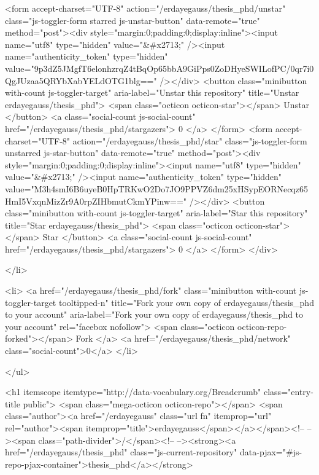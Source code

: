     <form accept-charset="UTF-8" action="/erdayegauss/thesis_phd/unstar" class="js-toggler-form starred js-unstar-button" data-remote="true" method="post"><div style="margin:0;padding:0;display:inline"><input name="utf8" type="hidden" value="&#x2713;" /><input name="authenticity_token" type="hidden" value="9p3dZ5JMgfT6elonhzrqZ4tBqOp65bbA9GiPps0ZoDHyeSWILofPC/0qr7i0QgJUzaa5QRYbXabYELdOTG1blg==" /></div>
      <button
        class="minibutton with-count js-toggler-target"
        aria-label="Unstar this repository" title="Unstar erdayegauss/thesis_phd">
        <span class="octicon octicon-star"></span>
        Unstar
      </button>
        <a class="social-count js-social-count" href="/erdayegauss/thesis_phd/stargazers">
          0
        </a>
</form>
    <form accept-charset="UTF-8" action="/erdayegauss/thesis_phd/star" class="js-toggler-form unstarred js-star-button" data-remote="true" method="post"><div style="margin:0;padding:0;display:inline"><input name="utf8" type="hidden" value="&#x2713;" /><input name="authenticity_token" type="hidden" value="M3h4smI6B6uyeB0HpTRKwO2Do7JO9PPVZ6dm25xHSypEORNecqz65HmI5VxqnMizZr9A0rpZIHbmutCkmYPinw==" /></div>
      <button
        class="minibutton with-count js-toggler-target"
        aria-label="Star this repository" title="Star erdayegauss/thesis_phd">
        <span class="octicon octicon-star"></span>
        Star
      </button>
        <a class="social-count js-social-count" href="/erdayegauss/thesis_phd/stargazers">
          0
        </a>
</form>  </div>

  </li>

        <li>
          <a href="/erdayegauss/thesis_phd/fork" class="minibutton with-count js-toggler-target tooltipped-n" title="Fork your own copy of erdayegauss/thesis_phd to your account" aria-label="Fork your own copy of erdayegauss/thesis_phd to your account" rel="facebox nofollow">
            <span class="octicon octicon-repo-forked"></span>
            Fork
          </a>
          <a href="/erdayegauss/thesis_phd/network" class="social-count">0</a>
        </li>

</ul>

        <h1 itemscope itemtype="http://data-vocabulary.org/Breadcrumb" class="entry-title public">
          <span class="mega-octicon octicon-repo"></span>
          <span class="author"><a href="/erdayegauss" class="url fn" itemprop="url" rel="author"><span itemprop="title">erdayegauss</span></a></span><!--
       --><span class="path-divider">/</span><!--
       --><strong><a href="/erdayegauss/thesis_phd" class="js-current-repository" data-pjax="#js-repo-pjax-container">thesis_phd</a></strong>

